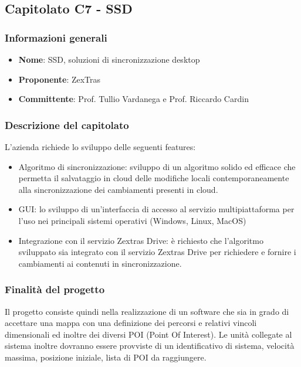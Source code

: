 					
	\subsection{Capitolato C7 - SSD}
		\subsubsection{Informazioni generali}
			\begin{itemize}
				\item\textbf{Nome}: SSD, soluzioni di sincronizzazione desktop
				\item\textbf{Proponente}: ZexTras
				\item\textbf{Committente}: Prof. Tullio Vardanega e Prof. Riccardo Cardin
			\end{itemize}
			
		\subsubsection{Descrizione del capitolato}
			L’azienda richiede lo sviluppo delle seguenti features:
			\begin{itemize}
				\item Algoritmo di sincronizzazione: sviluppo di un algoritmo solido ed efficace che permetta il salvataggio in cloud delle modifiche locali contemporaneamente alla sincronizzazione  dei cambiamenti presenti in cloud.
				\item GUI: lo sviluppo di un’interfaccia di accesso al servizio multipiattaforma per l’uso nei principali sistemi operativi (Windows, Linux, MacOS)
				\item Integrazione con il servizio Zextras Drive: è richiesto che l’algoritmo sviluppato sia integrato con il servizio Zextras Drive per richiedere e fornire i cambiamenti ai contenuti in sincronizzazione.
			\end{itemize}
		\subsubsection{Finalità del progetto}
			Il progetto consiste quindi nella realizzazione di un software che sia in grado di accettare una mappa con una definizione dei percorsi e relativi vincoli dimensionali ed inoltre dei diversi POI (Point Of Interest). Le unità collegate al sistema inoltre dovranno essere provviste di un identificativo di sistema, velocità massima, posizione iniziale, lista di POI da raggiungere.
